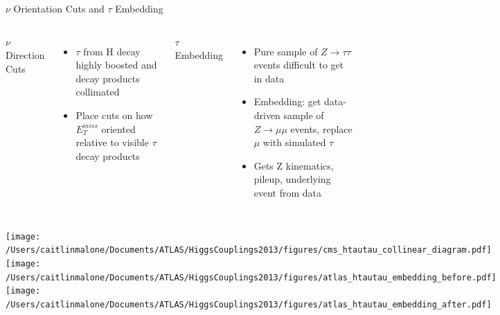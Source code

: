 \documentclass{beamer}
\begin{document}
\begin{frame}{$\nu$ Orientation Cuts and $\tau$ Embedding}
	\begin{columns}[c]
		$\nu$ Direction Cuts \\
		\begin{itemize} \scriptsize
			\item $\tau$ from H decay highly boosted and decay products collimated
			\item Place cuts on how $E_T^{miss}$ oriented relative to visible $\tau$ decay products
		\end{itemize}

		
		$\tau$ Embedding
			\begin{itemize} \scriptsize
				\item Pure sample of $Z\rightarrow\tau\tau$ events difficult to get in data
				\item Embedding: get data-driven sample of $Z\rightarrow\mu\mu$ events, replace $\mu$ with simulated $\tau$
				\item Gets Z kinematics, pileup, underlying event from data
			\end{itemize}
	\end{columns}
	
	\begin{columns}[c]
			\texttt{[image: /Users/caitlinmalone/Documents/ATLAS/HiggsCouplings2013/figures/cms\_htautau\_collinear\_diagram.pdf]}				
			\texttt{[image: /Users/caitlinmalone/Documents/ATLAS/HiggsCouplings2013/figures/atlas\_htautau\_embedding\_before.pdf]}
			\texttt{[image: /Users/caitlinmalone/Documents/ATLAS/HiggsCouplings2013/figures/atlas\_htautau\_embedding\_after.pdf]}	
	\end{columns}
\end{frame}
\end{document}
